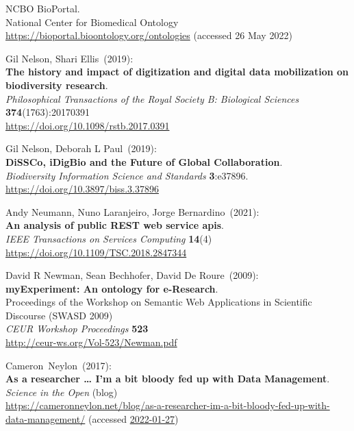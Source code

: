 \begin{thebibliography}{9}
NCBO BioPortal.\\
National Center for Biomedical Ontology \\
\url{https://bioportal.bioontology.org/ontologies} (accessed 26 May 2022)

Gil Nelson, Shari Ellis~(2019): \\
\textbf{The history and impact of digitization and digital data mobilization on biodiversity research}.\\
\emph{Philosophical Transactions of the Royal Society B: Biological Sciences}
\textbf{374}(1763):20170391\\
\url{https://doi.org/10.1098/rstb.2017.0391}

Gil Nelson, Deborah L Paul~(2019): \\
\textbf{DiSSCo, iDigBio and the Future of Global Collaboration}.\\
\emph{Biodiversity Information Science and Standards}
\textbf{3}:e37896.\\
\url{https://doi.org/10.3897/biss.3.37896}

Andy Neumann, Nuno Laranjeiro, Jorge Bernardino~(2021): \\
\textbf{An analysis of public {REST} web service apis}.\\
\emph{IEEE Transactions on Services Computing} \textbf{14}(4)\\
\url{https://doi.org/10.1109/TSC.2018.2847344}

David R Newman, Sean Bechhofer, David De Roure~(2009): \\
\textbf{myExperiment: An ontology for e-Research}.\\
Proceedings of the Workshop on Semantic Web Applications in Scientific Discourse (SWASD 2009)\\
\emph{CEUR Workshop Proceedings} \textbf{523}\\
\url{http://ceur-ws.org/Vol-523/Newman.pdf}

Cameron~Neylon~(2017): \\
\textbf{As a researcher \ldots{} I'm a bit bloody fed up with Data Management}.\\
\emph{Science in the Open} (blog)\\
\url{https://cameronneylon.net/blog/as-a-researcher-im-a-bit-bloody-fed-up-with-data-management/}
(accessed \href{https://web.archive.org/web/20220127113116/https://cameronneylon.net/blog/as-a-researcher-im-a-bit-bloody-fed-up-with-data-management/}{2022-01-27})


\end{thebibliography}

